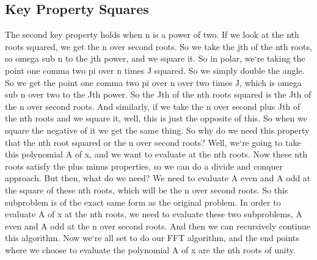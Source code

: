 \subsection{Key Property  Squares}
The second key property holds when n is a power of two.
If we look at the nth roots squared, we get the n over second roots.
So we take the jth of the nth roots, so omega sub n to the jth power, and we square it.
So in polar, we`re taking the point one comma two pi over n times J squared.
So we simply double the angle.
So we get the point one comma two pi over n over two times J, which is omega sub n over two to the Jth power.
So the Jth of the nth roots squared is the Jth of the n over second roots.
And similarly, if we take the n over second plus Jth of the nth roots and we square it, well, this is just the opposite of this.
So when we square the negative of it we get the same thing.
So why do we need this property that the nth root squared or the n over second roots? Well, we`re going to take this polynomial A of x, and we want to evaluate at the nth roots.
Now these nth roots satisfy the plus minus properties, so we can do a divide and conquer approach.
But then, what do we need? We need to evaluate A even and A odd at the square of these nth roots, which will be the n over second roots.
So this subproblem is of the exact same form as the original problem.
In order to evaluate A of x at the nth roots, we need to evaluate these two subproblems, A even and A odd at the n over second roots.
And then we can recursively continue this algorithm.
Now we`re all set to do our FFT algorithm, and the end points where we choose to evaluate the polynomial A of x are the nth roots of unity.

